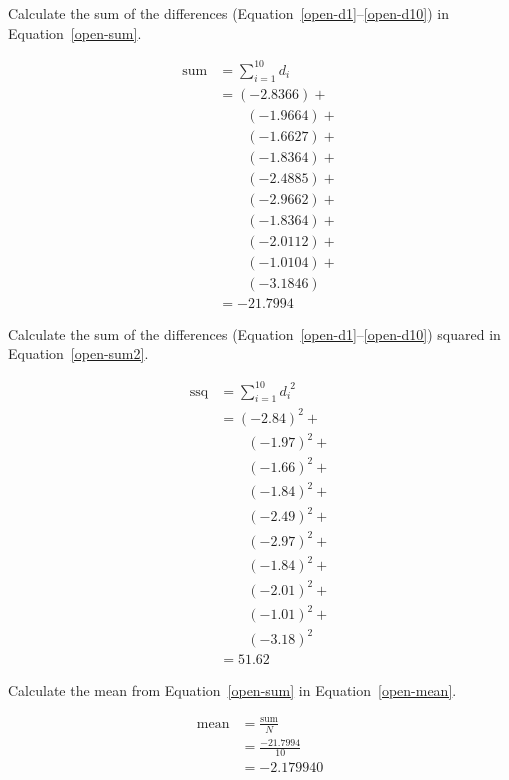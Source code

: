 \documentclass[twocolumn]{article}
\begin{document}
Calculate the sum of the differences (Equation~\ref{open-d1}--\ref{open-d10}) in Equation~\ref{open-sum}.

\begin{align}
\text{sum} &= \sum_{i=1}^{10} d_{i} \nonumber\\
 &= (-2.8366) + \nonumber\\
 &\quad\quad (-1.9664) + \nonumber\\
 &\quad\quad (-1.6627) + \nonumber\\
 &\quad\quad (-1.8364) + \nonumber\\
 &\quad\quad (-2.4885) + \nonumber\\
 &\quad\quad (-2.9662) + \nonumber\\
 &\quad\quad (-1.8364) + \nonumber\\
 &\quad\quad (-2.0112) + \nonumber\\
 &\quad\quad (-1.0104) + \nonumber\\
 &\quad\quad (-3.1846) \nonumber\\
 &= -21.7994 \label{open-sum}
\end{align}

Calculate the sum of the differences (Equation~\ref{open-d1}--\ref{open-d10}) squared in Equation~\ref{open-sum2}.

\begin{align}
\text{ssq} &= \sum_{i=1}^{10} d_{i}^{\phantom{i}2} \nonumber\\
 &= (-2.84)^2 + \nonumber\\
 &\quad\quad (-1.97)^2 + \nonumber\\
 &\quad\quad (-1.66)^2 + \nonumber\\
 &\quad\quad (-1.84)^2 + \nonumber\\
 &\quad\quad (-2.49)^2 + \nonumber\\
 &\quad\quad (-2.97)^2 + \nonumber\\
 &\quad\quad (-1.84)^2 + \nonumber\\
 &\quad\quad (-2.01)^2 + \nonumber\\
 &\quad\quad (-1.01)^2 + \nonumber\\
 &\quad\quad (-3.18)^2 \nonumber\\
 &= 51.62 \label{open-sum2}
\end{align}

Calculate the mean from Equation~\ref{open-sum} in Equation~\ref{open-mean}.

\begin{align}
\text{mean} &= \frac{\text{sum}}{N} \nonumber\\
 &= \frac{-21.7994}{10} \nonumber\\
 &= -2.179940 \label{open-mean}
\end{align}
\end{document}
